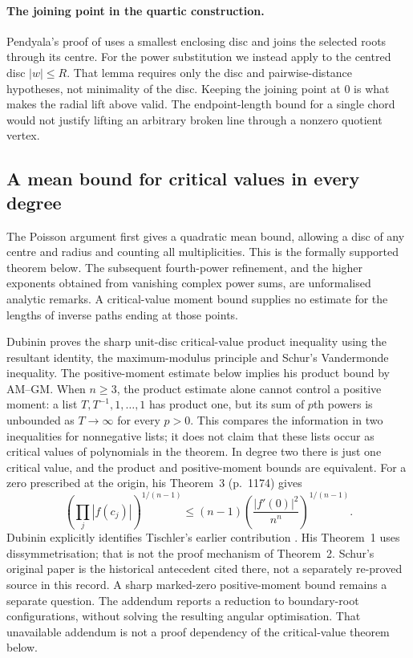 \paragraph{The joining point in the quartic construction.}
Pendyala's proof of \cite[Theorem~1, pp.~2--3]{june2026} uses a
smallest enclosing disc and joins the selected roots through its centre.
For the power substitution we instead apply \cite[Lemma~1]{june2026}
to the centred disc $|w|\le R$. That lemma requires only the disc and
pairwise-distance hypotheses, not minimality of the disc. Keeping the
joining point at $0$ is what makes the radial lift above valid. The
endpoint-length bound for a single chord would not justify lifting an
arbitrary broken line through a nonzero quotient vertex.

\subsection*{A mean bound for critical values in every degree}

The Poisson argument first gives a quadratic mean bound, allowing a
disc of any centre and radius and counting all multiplicities. This is
the formally supported theorem below. The subsequent fourth-power
refinement, and the higher exponents obtained from vanishing complex
power sums, are unformalised analytic remarks. A critical-value moment
bound supplies no estimate for the lengths of inverse paths ending at
those points.

Dubinin \cite[Theorem~2, (9), pp.~1172--1173]{dubinin2006critical}
proves the sharp unit-disc critical-value product inequality using the
resultant identity, the maximum-modulus principle and Schur's Vandermonde
inequality. The positive-moment estimate below implies his product bound
by AM--GM. When $n\ge3$, the product estimate alone cannot control a
positive moment: a list $T,T^{-1},1,\ldots,1$ has product one, but its
sum of $p$th powers is unbounded as $T\to\infty$ for every $p>0$.
This compares the information in two inequalities for nonnegative lists;
it does not claim that these lists occur as critical values of polynomials
in the theorem. In degree two there is just one critical value, and the
product and positive-moment bounds are equivalent.
For a zero prescribed at the origin, his Theorem~3 (p.~1174) gives
\[
 \left(\prod_j|f(c_j)|\right)^{1/(n-1)}
 \le(n-1)\left(\frac{|f'(0)|^2}{n^n}\right)^{1/(n-1)}.
\]
Dubinin explicitly identifies Tischler's earlier contribution
\cite[p.~444, as reported in Dubinin]{tischler1989}.
His Theorem~1 uses dissymmetrisation; that is not the proof mechanism of
Theorem~2.  Schur's original paper \cite{schur1918} is the historical
antecedent cited there, not a separately re-proved source in this record.
A sharp marked-zero positive-moment bound remains a separate question.
The addendum \cite[Section~3]{revision2026} reports a reduction to
boundary-root configurations, without solving the resulting angular
optimisation. That unavailable addendum is not a proof dependency of the
critical-value theorem below.

